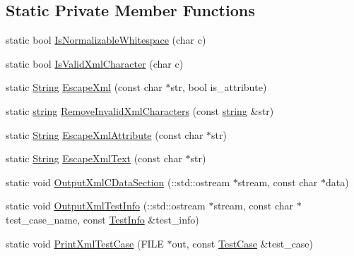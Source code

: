 \subsection*{\-Static \-Private \-Member \-Functions}
\begin{DoxyCompactItemize}
\item 
static bool \hyperlink{classtesting_1_1internal_1_1XmlUnitTestResultPrinter_a3d910f5c6a752c629a276a8585640795}{\-Is\-Normalizable\-Whitespace} (char c)
\item 
static bool \hyperlink{classtesting_1_1internal_1_1XmlUnitTestResultPrinter_a18cfed6b1b9d7aedd2c43129c7e46e95}{\-Is\-Valid\-Xml\-Character} (char c)
\item 
static \hyperlink{classtesting_1_1internal_1_1String}{\-String} \hyperlink{classtesting_1_1internal_1_1XmlUnitTestResultPrinter_a518c5e6812aa496afd62eac740a7d251}{\-Escape\-Xml} (const char $\ast$str, bool is\-\_\-attribute)
\item 
static \hyperlink{namespacetesting_1_1internal_a9882e571372fc19a02d2b2949e1f1557}{string} \hyperlink{classtesting_1_1internal_1_1XmlUnitTestResultPrinter_aa1a7bc460bd584676198c6fea285be17}{\-Remove\-Invalid\-Xml\-Characters} (const \hyperlink{namespacetesting_1_1internal_a9882e571372fc19a02d2b2949e1f1557}{string} \&str)
\item 
static \hyperlink{classtesting_1_1internal_1_1String}{\-String} \hyperlink{classtesting_1_1internal_1_1XmlUnitTestResultPrinter_a96cf735f70894f043d9f39f02bff8535}{\-Escape\-Xml\-Attribute} (const char $\ast$str)
\item 
static \hyperlink{classtesting_1_1internal_1_1String}{\-String} \hyperlink{classtesting_1_1internal_1_1XmlUnitTestResultPrinter_a18cfca127592a1649ac9a536b7d3a2be}{\-Escape\-Xml\-Text} (const char $\ast$str)
\item 
static void \hyperlink{classtesting_1_1internal_1_1XmlUnitTestResultPrinter_abe3b759db2f664b7f61500b785d9f2a4}{\-Output\-Xml\-C\-Data\-Section} (\-::std\-::ostream $\ast$stream, const char $\ast$data)
\item 
static void \hyperlink{classtesting_1_1internal_1_1XmlUnitTestResultPrinter_a1385d3994e1daf7d80693bc6936e9853}{\-Output\-Xml\-Test\-Info} (\-::std\-::ostream $\ast$stream, const char $\ast$test\-\_\-case\-\_\-name, const \hyperlink{classtesting_1_1TestInfo}{\-Test\-Info} \&test\-\_\-info)
\item 
static void \hyperlink{classtesting_1_1internal_1_1XmlUnitTestResultPrinter_a99988d51cbfd1b80223fa052c673395f}{\-Print\-Xml\-Test\-Case} (\-F\-I\-L\-E $\ast$out, const \hyperlink{classtesting_1_1TestCase}{\-Test\-Case} \&test\-\_\-case)

\end{DoxyCompactItemize}
